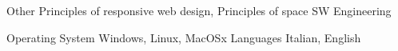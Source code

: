 \begin{cvskills}
\hline
\cvskill
{Other} %
{Principles of responsive web design, Principles of space SW Engineering
} %

\hline
\cvskill
{Operating System} %
{Windows, Linux, MacOSx} %
\hline
\cvskill
{Languages} %
{Italian, English} %


\end{cvskills}